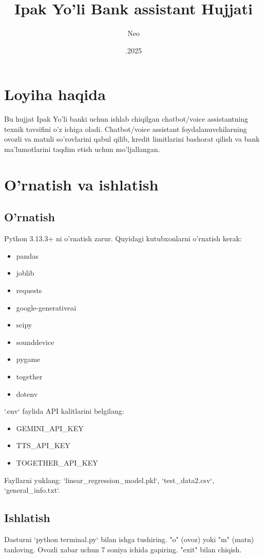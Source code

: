 \documentclass[a4paper,12pt]{article}
\title{Ipak Yo'li Bank assistant Hujjati}
\author{Neo}
\date{\05.05.2025}
\begin{document}
\maketitle

\section{Loyiha haqida}
Bu hujjat Ipak Yo'li banki uchun ishlab chiqilgan chatbot/voice assistantning texnik tavsifini o'z ichiga oladi. Chatbot/voice assistant foydalanuvchilarning ovozli va matnli so'rovlarini qabul qilib, kredit limitlarini bashorat qilish va bank ma'lumotlarini taqdim etish uchun mo'ljallangan.

\section{O'rnatish va ishlatish}
\subsection{O'rnatish}
Python 3.13.3+ ni o'rnatish zarur. Quyidagi kutubxonlarni o'rnatish kerak:
\begin{itemize}
    \item pandas
    \item joblib
    \item requests
    \item google-generativeai
    \item scipy
    \item sounddevice
    \item pygame
    \item together
    \item dotenv
\end{itemize}
`.env` faylida API kalitlarini belgilang:
\begin{itemize}
    \item GEMINI\_API\_KEY
    \item TTS\_API\_KEY
    \item TOGETHER\_API\_KEY
\end{itemize}
Fayllarni yuklang: `linear_regression_model.pkl`, `test_data2.csv`, `general_info.txt`.

\subsection{Ishlatish}
Dasturni `python terminal.py` bilan ishga tushiring. "o" (ovoz) yoki "m" (matn) tanloving. Ovozli xabar uchun 7 soniya ichida gapiring. "exit" bilan chiqish.
\end{document}
